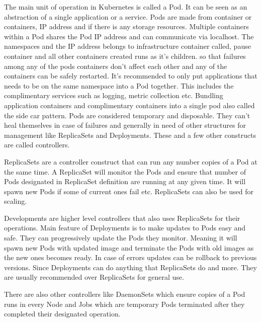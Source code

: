 \documentclass[12pt,oneandhalf,chaparabic,ceng,ms,eng,oneside,pntc]{gsufbe}
\begin{document}
The main unit of operation in Kubernetes is called a Pod. It can be seen as an abstraction of a single
application or a service. Pods are made from container or containers, IP address and if there is any
storage resources. Multiple containers within a Pod shares the Pod IP address and can communicate via
localhost. The namespaces and the IP address belongs to infrastructure container called, pause 
container and all other containers created runs as it’s children. so that failures among any of the 
pods containers don't affect each other and any of the containers can be safely restarted. It's 
recommended to only put applications that needs to be on the same namespace into a Pod together. This
includes the complimentary services such as logging, metric collection etc. Bundling application
containers and complimentary containers into a single pod also called the side car pattern. Pods are
considered temporary and disposable. They can’t heal themselves in case of failures and generally in
need of other structures for management like ReplicaSets and Deployments. These and a few other
constructs are called controllers.

ReplicaSets are a controller construct that can run any number copies of a Pod at the same time. A 
ReplicaSet will monitor the Pods and ensure that number of Pods designated in ReplicaSet definition are
running at any given time. It will spawn new Pods if some of current ones fail etc. ReplicaSets can
also be used for scaling. 

Developments are higher level controllers that also uses ReplicaSets for their operations. Main feature
of Deployments is to make updates to Pods easy and safe. They can progressively update the Pods they
monitor. Meaning it will spawn new Pods with updated image and terminate the Pods with old images as
the new ones becomes ready. In case of errors updates can be rollback to previous versions. Since
Deployments can do anything that ReplicaSets do and more. They are usually recommended over ReplicaSets
for general use.

There are also other controllers like DaemonSets which ensure copies of a Pod runs in every Node and
Jobs which are temporary Pods terminated after they completed their designated operation.
\end{document}

